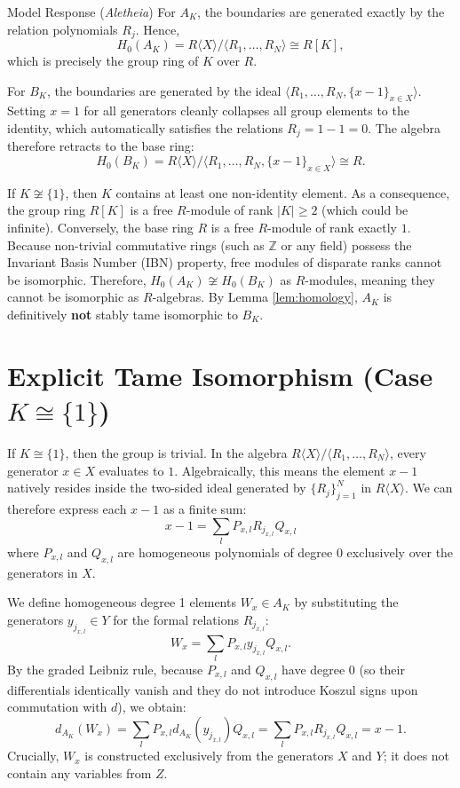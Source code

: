 \documentclass{article}
\theoremstyle{plain}
\theoremstyle{definition}
\newcommand{\Aletheia}{\emph{Aletheia}}
\begin{document}
\begin{solution}{Model Response (\Aletheia)}
For $A_K$, the boundaries are generated exactly by the relation polynomials $R_j$. Hence,
\[
H_0(A_K) = R\langle X \rangle / \langle R_1, \dots, R_N \rangle \cong R[K],
\]
which is precisely the group ring of $K$ over $R$.

For $B_K$, the boundaries are generated by the ideal $\langle R_1, \dots, R_N, \{x - 1\}_{x \in X} \rangle$. Setting $x = 1$ for all generators cleanly collapses all group elements to the identity, which automatically satisfies the relations $R_j = 1 - 1 = 0$. The algebra therefore retracts to the base ring:
\[
H_0(B_K) = R\langle X \rangle / \langle R_1, \dots, R_N, \{x - 1\}_{x \in X} \rangle \cong R.
\]

If $K \not\cong \{1\}$, then $K$ contains at least one non-identity element. As a consequence, the group ring $R[K]$ is a free $R$-module of rank $|K| \ge 2$ (which could be infinite). Conversely, the base ring $R$ is a free $R$-module of rank exactly $1$. Because non-trivial commutative rings (such as $\mathbb{Z}$ or any field) possess the Invariant Basis Number (IBN) property, free modules of disparate ranks cannot be isomorphic. Therefore, $H_0(A_K) \not\cong H_0(B_K)$ as $R$-modules, meaning they cannot be isomorphic as $R$-algebras. By Lemma \ref{lem:homology}, $A_K$ is definitively \textbf{not} stably tame isomorphic to $B_K$.

\section{Explicit Tame Isomorphism (Case $K \cong \{1\}$)}

If $K \cong \{1\}$, then the group is trivial. In the algebra $R\langle X \rangle / \langle R_1, \dots, R_N \rangle$, every generator $x \in X$ evaluates to $1$. Algebraically, this means the element $x - 1$ natively resides inside the two-sided ideal generated by $\{R_j\}_{j=1}^N$ in $R\langle X \rangle$. We can therefore express each $x - 1$ as a finite sum:
\[
x - 1 = \sum_{l} P_{x,l} R_{j_{x,l}} Q_{x,l}
\]
where $P_{x,l}$ and $Q_{x,l}$ are homogeneous polynomials of degree 0 exclusively over the generators in $X$.

We define homogeneous degree 1 elements $W_x \in A_K$ by substituting the generators $y_{j_{x,l}} \in Y$ for the formal relations $R_{j_{x,l}}$:
\[
W_x = \sum_{l} P_{x,l} y_{j_{x,l}} Q_{x,l}.
\]
By the graded Leibniz rule, because $P_{x,l}$ and $Q_{x,l}$ have degree 0 (so their differentials identically vanish and they do not introduce Koszul signs upon commutation with $d$), we obtain:
\[
d_{A_K}(W_x) = \sum_{l} P_{x,l} d_{A_K}(y_{j_{x,l}}) Q_{x,l} = \sum_{l} P_{x,l} R_{j_{x,l}} Q_{x,l} = x - 1.
\]
Crucially, $W_x$ is constructed exclusively from the generators $X$ and $Y$; it does not contain any variables from $Z$.


\end{solution}
\end{document}
